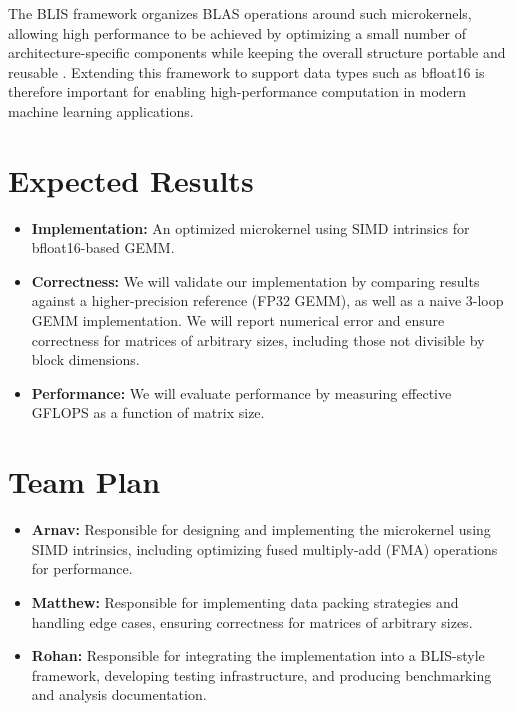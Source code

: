 \documentclass[11pt]{article}
\begin{document}
The BLIS framework organizes BLAS operations around such microkernels, allowing high performance to be achieved by optimizing a small number of architecture-specific components while keeping the overall structure portable and reusable \cite{Zee2015BLISAF}. Extending this framework to support data types such as bfloat16 is therefore important for enabling high-performance computation in modern machine learning applications.

\section{Expected Results}

\begin{itemize}
    \item \textbf{Implementation:} 
    An optimized microkernel using SIMD intrinsics for bfloat16-based GEMM. 

    \item \textbf{Correctness:} 
    We will validate our implementation by comparing results against a higher-precision reference (FP32 GEMM), as well as a naive 3-loop GEMM implementation. 
    We will report numerical error and ensure correctness for matrices of arbitrary sizes, including those not divisible by block dimensions.

    \item \textbf{Performance:} 
    We will evaluate performance by measuring effective GFLOPS as a function of matrix size. 
\end{itemize}

\section*{Team Plan}

\begin{itemize}
    \item \textbf{Arnav:} Responsible for designing and implementing the microkernel using SIMD intrinsics, including optimizing fused multiply-add (FMA) operations for performance.

    \item \textbf{Matthew:} Responsible for implementing data packing strategies and handling edge cases, ensuring correctness for matrices of arbitrary sizes.

    \item \textbf{Rohan:} Responsible for integrating the implementation into a BLIS-style framework, developing testing infrastructure, and producing benchmarking and analysis documentation.
\end{itemize}




\end{document}
